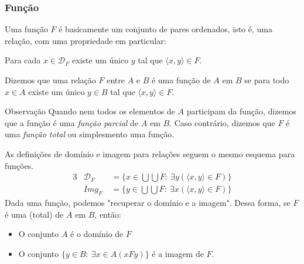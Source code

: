 \subsubsection{Função}
Uma função $F$ é basicamente um conjunto de pares ordenados, isto é, uma relação, com uma propriedade em particular:
\begin{stat}
  Para cada $x \in \mathcal{D}_{F}$ existe um único $y$ tal que $\langle x, y \rangle \in F.$
\end{stat}
\begin{definition}
  Dizemos que uma relação $F$ entre $A$ e $B$ é uma função de $A$ em $B$ se para todo $x \in A$ existe um único $y \in B$ tal que $\langle x, y \rangle \in F.$ 
\end{definition}
\begin{mymdframed}{Observação}
  Quando nem todos os elementos de $A$ participam da função, dizemos que a função é uma \textit{função parcial} de $A$ em $B$. Caso contrário, dizemos que $F$ é uma \textit{função total} ou simplesmento uma função.
\end{mymdframed}
As definições de domínio e imagem para relações seguem o mesmo esquema para funções.
\begin{alignat*}{3}
  & \mathcal{D}_{F}& \ = \{x \in \bigcup \bigcup F:\ \exists y (\langle x, y \rangle \in F) \}\\
  & \mathit{Img}_{F}& \ = \{y \in \bigcup \bigcup F:\ \exists x (\langle x, y \rangle \in F)\}
\end{alignat*}
Dada uma função, podemos "recuperar o domínio e a imagem". Dessa forma, se $F$ é uma (total) de $A$ em $B$, então:
\begin{itemize}
  \item O conjunto $A$ é o domínio de $F$
  \item O conjunto $\{y \in B:\ \exists x \in A(xFy)\}$ é a imagem de $F.$
\end{itemize}
\newpage

